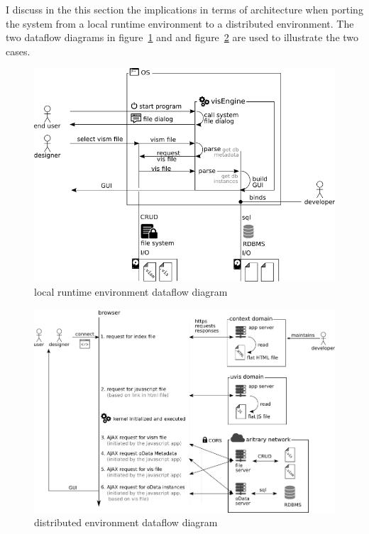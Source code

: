 I discuss in the this section the implications in terms of architecture when porting the system from a local runtime environment to a distributed environment. The two dataflow diagrams in figure~\ref{img:dataflow_OS} and and figure~\ref{img:dataflow_Web} are used to illustrate the two cases.

\begin{figure}
    \centering
    \includegraphics[angle=90,width=1\textwidth]{images/1_OS_dataflow_diagram.png}
    \caption{local runtime environment dataflow diagram}
    \label{img:dataflow_OS}
\end{figure}

\begin{figure}
    \centering
    \includegraphics[angle=90,width=1\textwidth]{images/2_web_dataflow_diagram.png}
    \caption{distributed environment dataflow diagram}
    \label{img:dataflow_Web}
\end{figure}

